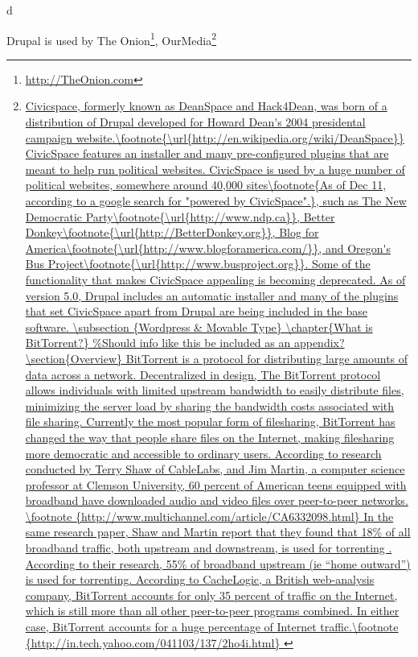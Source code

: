 d\documentclass[a4paper,12pt]{report}
\begin{document}
Drupal is used by The Onion\footnote{\url{http://TheOnion.com}}, OurMedia\footnote{\url{
Civicspace, formerly known as DeanSpace and Hack4Dean, was born of a distribution of Drupal developed for Howard Dean's 2004 presidental campaign website.\footnote{\url{http://en.wikipedia.org/wiki/DeanSpace}}
CivicSpace features an installer and many pre-configured plugins that are meant to help run political websites.
CivicSpace is used by a huge number of political websites, somewhere around 40,000 sites\footnote{As of Dec 11, according to a google search for "powered by CivicSpace".}, such as The New Democratic Party\footnote{\url{http://www.ndp.ca}}, Better Donkey\footnote{\url{http://BetterDonkey.org}}, Blog for America\footnote{\url{http://www.blogforamerica.com/}}, and Oregon's Bus Project\footnote{\url{http://www.busproject.org}}.
Some of the functionality that makes CivicSpace appealing is becoming deprecated. 
As of version 5.0, Drupal includes an automatic installer and many of the plugins that set CivicSpace apart from Drupal are being included in the base software.

\subsection {Wordpress & Movable Type}

\chapter{What is BitTorrent?}
\section{Overview}
BitTorrent is a protocol for distributing large amounts of data across a network. 
Decentralized in design, The BitTorrent protocol allows individuals with limited upstream bandwidth to easily distribute files, minimizing the server load by sharing the bandwidth costs associated with file sharing. 

Currently the most popular form of filesharing, BitTorrent has changed the way that people share files on the Internet, making filesharing more democratic and accessible to ordinary users.
According to research conducted by Terry Shaw of CableLabs, and Jim Martin, a computer science professor at Clemson University, 60 percent of American teens equipped with broadband have downloaded audio and video files over peer-to-peer networks. \footnote {http://www.multichannel.com/article/CA6332098.html}
In the same research paper, Shaw and Martin report that they found that 18\% of all broadband traffic, both upstream and downstream, is used for torrenting . 
According to their research, 55\% of broadband upstream (ie “home outward”) is used for torrenting.
According to CacheLogic, a British web-analysis company, BitTorrent accounts for only 35 percent of traffic on the Internet, which is still more than all other peer-to-peer programs combined.  
In either case, BitTorrent accounts for a huge percentage of Internet traffic.\footnote {http://in.tech.yahoo.com/041103/137/2ho4i.html}

}}
\end{document}
